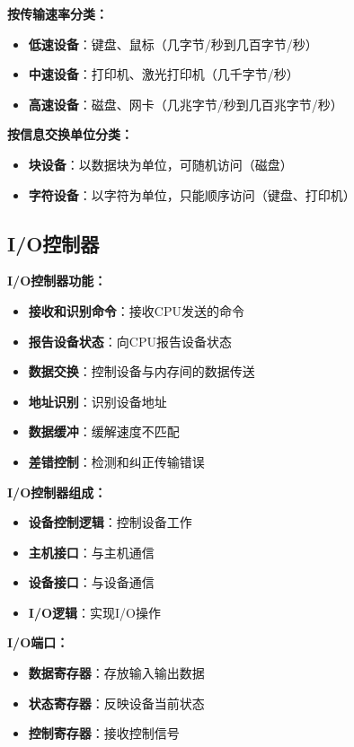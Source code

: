 \documentclass[lang=cn,newtx,10pt,scheme=chinese]{../../elegantbook}
\begin{document}
\textbf{按传输速率分类：}
\begin{itemize}
  \item \textbf{低速设备}：键盘、鼠标（几字节/秒到几百字节/秒）
  \item \textbf{中速设备}：打印机、激光打印机（几千字节/秒）
  \item \textbf{高速设备}：磁盘、网卡（几兆字节/秒到几百兆字节/秒）
\end{itemize}

\textbf{按信息交换单位分类：}
\begin{itemize}
  \item \textbf{块设备}：以数据块为单位，可随机访问（磁盘）
  \item \textbf{字符设备}：以字符为单位，只能顺序访问（键盘、打印机）
\end{itemize}

\subsection{I/O控制器}

\textbf{I/O控制器功能：}
\begin{itemize}
  \item \textbf{接收和识别命令}：接收CPU发送的命令
  \item \textbf{报告设备状态}：向CPU报告设备状态
  \item \textbf{数据交换}：控制设备与内存间的数据传送
  \item \textbf{地址识别}：识别设备地址
  \item \textbf{数据缓冲}：缓解速度不匹配
  \item \textbf{差错控制}：检测和纠正传输错误
\end{itemize}

\textbf{I/O控制器组成：}
\begin{itemize}
  \item \textbf{设备控制逻辑}：控制设备工作
  \item \textbf{主机接口}：与主机通信
  \item \textbf{设备接口}：与设备通信
  \item \textbf{I/O逻辑}：实现I/O操作
\end{itemize}

\textbf{I/O端口：}
\begin{itemize}
  \item \textbf{数据寄存器}：存放输入输出数据
  \item \textbf{状态寄存器}：反映设备当前状态
  \item \textbf{控制寄存器}：接收控制信号
\end{itemize}
\end{document}
